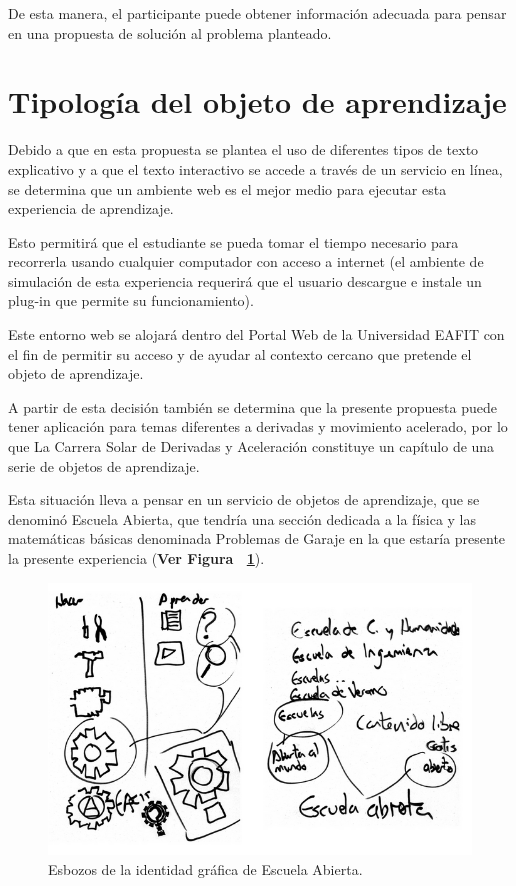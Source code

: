 \documentclass[twoside,letterpaper,11pt]{report}
\begin{document}
De esta manera, el participante puede obtener información adecuada para pensar en una propuesta de solución al problema planteado.


\section{Tipología del objeto de aprendizaje} %
\label{sec:tipolog_a_del_objeto_de_aprendizaje}

Debido a que en esta propuesta se plantea el uso de diferentes tipos de texto explicativo y a que el texto interactivo se accede a través de un servicio en línea, se determina que un ambiente web es el mejor medio para ejecutar esta experiencia de aprendizaje.

Esto permitirá que el estudiante se pueda tomar el tiempo necesario para recorrerla usando cualquier computador con acceso a internet (el ambiente de simulación de esta experiencia requerirá que el usuario descargue e instale un plug-in que permite su funcionamiento).

Este entorno web se alojará dentro del Portal Web de la Universidad EAFIT con el fin de permitir su acceso y de ayudar al contexto cercano que pretende el objeto de aprendizaje.
 
A partir de esta decisión también se determina que la presente propuesta puede tener aplicación para temas diferentes a derivadas y movimiento acelerado, por lo que La Carrera Solar de Derivadas y Aceleración constituye un capítulo de una serie de objetos de aprendizaje. 

Esta situación lleva a pensar en un servicio de objetos de aprendizaje, que se denominó Escuela Abierta, que tendría una sección dedicada a la física y las matemáticas básicas denominada Problemas de Garaje en la que estaría presente la presente experiencia (\textbf{Ver Figura ~\ref{esbozos}}). 

\begin{figure}[h!]
\label{esbozos}
\includegraphics[width=1\textwidth]{aux/esbozos}
\caption{Esbozos de la identidad gráfica de Escuela Abierta.}
\end{figure}
\end{document}
